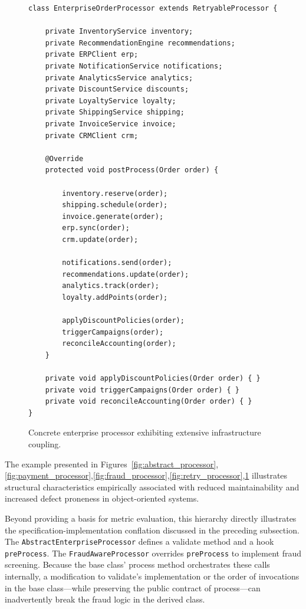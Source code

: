 \begin{figure}[t]
\centering
\begin{verbatim}
class EnterpriseOrderProcessor extends RetryableProcessor {

    private InventoryService inventory;
    private RecommendationEngine recommendations;
    private ERPClient erp;
    private NotificationService notifications;
    private AnalyticsService analytics;
    private DiscountService discounts;
    private LoyaltyService loyalty;
    private ShippingService shipping;
    private InvoiceService invoice;
    private CRMClient crm;

    @Override
    protected void postProcess(Order order) {

        inventory.reserve(order);
        shipping.schedule(order);
        invoice.generate(order);
        erp.sync(order);
        crm.update(order);

        notifications.send(order);
        recommendations.update(order);
        analytics.track(order);
        loyalty.addPoints(order);

        applyDiscountPolicies(order);
        triggerCampaigns(order);
        reconcileAccounting(order);
    }

    private void applyDiscountPolicies(Order order) { }
    private void triggerCampaigns(Order order) { }
    private void reconcileAccounting(Order order) { }
}
\end{verbatim}
\caption{Concrete enterprise processor exhibiting extensive infrastructure coupling.}
\label{fig:enterprise_processor}
\end{figure}

The example presented in Figures~\ref{fig:abstract_processor},\ref{fig:payment_processor},\ref{fig:fraud_processor},\ref{fig:retry_processor},\ref{fig:enterprise_processor} illustrates structural characteristics empirically associated with reduced maintainability and increased defect proneness in object-oriented systems.

Beyond providing a basis for metric evaluation, this hierarchy directly illustrates the specification-implementation conflation discussed in the preceding subsection. The \texttt{AbstractEnterpriseProcessor} defines a validate method and a hook \texttt{preProcess}. The \texttt{FraudAwareProcessor} overrides \texttt{preProcess} to implement fraud screening. Because the base class' process method orchestrates these calls internally, a modification to validate's implementation or the order of invocations in the base class—while preserving the public contract of process—can inadvertently break the fraud logic in the derived class.

